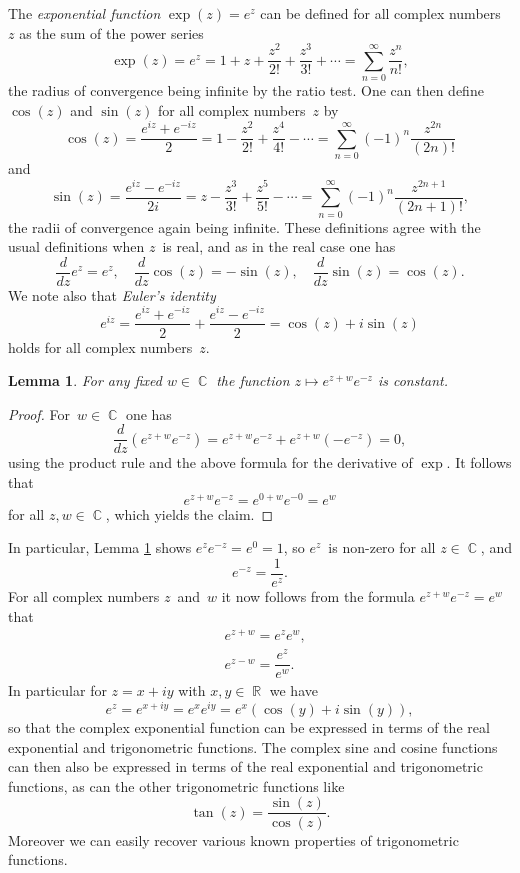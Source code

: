 \documentclass{amsproc}
\newtheorem{lemma}[theorem]{Lemma}
\theoremstyle{definition}
\theoremstyle{remark}
\DeclareMathOperator{\R}{\mathbb{R}}
\DeclareMathOperator{\C}{\mathbb{C}}
\numberwithin{equation}{section}
\begin{document}
The \emph{exponential function} $ \exp(z) = e^z $ can be defined for all complex numbers~$ z $ as the sum of the power series
$$
\exp(z) = e^z = 1 + z + \dfrac{z^2}{2!} + \dfrac{z^3}{3!} + \cdots = \sum_{n = 0}^\infty \dfrac{z^n}{n!},
$$
the radius of convergence being infinite by the ratio test. One can then define $ \cos(z) $ and $ \sin(z) $ for all complex numbers~$ z $ by
$$
\cos(z) = \dfrac{e^{iz} + e^{-iz}}{2} = 1 - \dfrac{z^2}{2!} + \dfrac{z^4}{4!} - \cdots = \sum_{n = 0}^\infty (-1)^n \frac{z^{2n}}{(2n)!}
$$
and
$$
\sin(z) = \dfrac{e^{iz} - e^{-iz}}{2i} = z - \dfrac{z^3}{3!} + \dfrac{z^5}{5!} - \cdots = \sum_{n = 0}^\infty (-1)^n \frac{z^{2n + 1}}{(2n + 1)!} ,
$$
the radii of convergence again being infinite. These definitions agree with the usual definitions when $ z $~is real, and as in the real case one has
$$
\dfrac{d}{dz}e^z=e^z,\quad
\dfrac{d}{dz}\cos(z)=-\sin(z),\quad
\dfrac{d}{dz}\sin(z)=\cos(z).
$$
We note also that \emph{Euler's identity}
$$
e^{iz}
= \dfrac{e^{iz}+e^{-iz}}{2}+\dfrac{e^{iz}-e^{-iz}}{2}
= \cos(z) + i\sin(z)
$$
holds for all complex numbers~$ z $.

\begin{lemma} \label{CME3a}
For any fixed $ w \in \C $ the function $ z \mapsto e^{z + w}e^{-z} $ is constant.
\end{lemma}

\begin{proof}
For~$ w \in \C $ one has
$$
\dfrac{d}{dz}(e^{z+w} e^{-z}) = e^{z+w}e^{-z} + e^{z+w}(-e^{-z}) = 0,
$$
using the product rule and the above formula for the derivative of $ \exp $.
It follows that
$$
e^{z+w}e^{-z} = e^{0+w}e^{-0} = e^w
$$
for all $ z,w \in \C $, which yields the claim.
\end{proof}

In particular, Lemma \ref{CME3a} shows $ e^z e^{-z} = e^0 = 1 $, so $ e^z $~is non-zero for all $ z \in \C $, and
$$
e^{-z} = \dfrac{1}{e^z}.
$$
For all complex numbers $ z $~and~$ w $ it now follows from the formula $ e^{z + w} e^{-z} = e^w $ that
\begin{align*}
&e^{z+w} = e^z e^w,\\
&e^{z-w} = \dfrac{e^z}{e^w}.
\end{align*}
In particular for $ z = x + iy $ with $ x,y \in \R $ we have
$$
e^z = e^{x + iy} = e^x e^{iy} = e^x(\cos(y) + i\sin(y)),
$$
so that the complex exponential function can be expressed in terms of the real exponential and trigonometric functions. The complex sine and cosine functions can
then also be expressed in terms of the real exponential and trigonometric functions, as can the other trigonometric functions like
$$
\tan(z) = \dfrac{\sin(z)}{\cos(z)}.
$$
Moreover we can easily recover various known properties of trigonometric functions.
\end{document}
